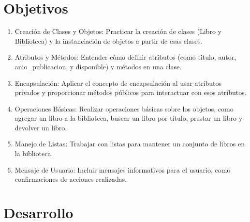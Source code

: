 \documentclass[11pt,a4paper]{article}
\begin{document}
\section{Objetivos}
\begin{enumerate}
    \item Creación de Clases y Objetos: Practicar la creación de clases (Libro y Biblioteca) y la instanciación de objetos a partir de esas clases.
    \item Atributos y Métodos: Entender cómo definir atributos (como titulo, autor, anio\_publicacion, y disponible) y métodos en una clase.
    \item Encapsulación: Aplicar el concepto de encapsulación al usar atributos privados y proporcionar métodos públicos para interactuar con esos atributos.
    \item Operaciones Básicas: Realizar operaciones básicas sobre los objetos, como agregar un libro a la biblioteca, buscar un libro por título, prestar un libro y devolver un libro.
    \item Manejo de Listas: Trabajar con listas para mantener un conjunto de libros en la biblioteca.
    \item Mensaje de Usuario: Incluir mensajes informativos para el usuario, como confirmaciones de acciones realizadas.

\end{enumerate}

\section{Desarrollo}
\end{document}
